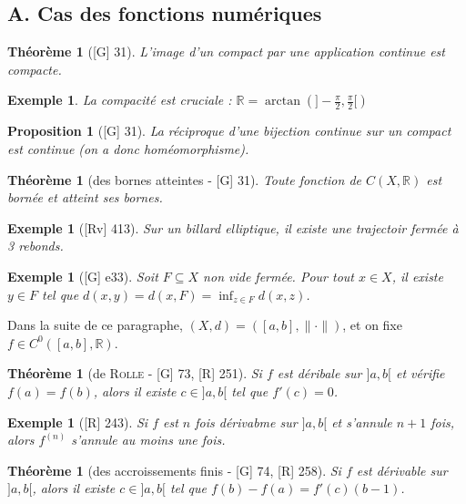 \documentclass[10pt, a4paper, parskip=full, twoside, twocolumn]{report}
\newtheorem{theorem}[definition]{Théorème}
\newtheorem{proposition}[definition]{Proposition}
\newtheorem{example}[definition]{Exemple}
\newcommand{\IR}{\mathbb{R}}
\begin{document}
\subsection*{A. Cas des fonctions numériques}

\begin{theorem}[\textnormal{[G] 31}]
	L'image d'un compact par une application continue est compacte.
\end{theorem}

\begin{example}
	La compacité est cruciale : $\IR = \arctan\left(]-\frac{\pi}{2},\frac{\pi}{2}[\right)$
\end{example}

\begin{proposition}[\textnormal{[G] 31}]
	La réciproque d'une bijection continue sur un compact est continue (on a donc homéomorphisme).
\end{proposition}

\begin{theorem}[des bornes atteintes - \textnormal{[G] 31}]
	Toute fonction de $C(X,\IR)$ est bornée et atteint ses bornes.
\end{theorem}

\begin{example}[\textnormal{[Rv] 413}]
	Sur un billard elliptique, il existe une trajectoir fermée à 3 rebonds.
\end{example}

\begin{example}[\textnormal{[G] e33}]
	Soit $F\subseteq X$ non vide fermée. Pour tout $x\in X$, il existe $y\in F$ tel que $d(x,y)=d(x,F)=\inf_{z\in F} d(x,z)$.
\end{example}

\textcolor{paragraphtext}{Dans la suite de ce paragraphe, $(X,d) = ([a,b], \|\cdot\|)$, et on fixe $f\in C^0([a,b], \IR)$.}

\begin{theorem}[de \textsc{Rolle} - \textnormal{[G] 73, [R] 251}]
	Si $f$ est déribale sur $]a,b[$ et vérifie $f(a)=f(b)$, alors il existe $c\in ]a,b[$ tel que $f'(c)=0$.
\end{theorem}

\begin{example}[\textnormal{[R] 243}]
	Si $f$ est $n$ fois dérivabme sur $]a,b[$ et s'annule $n+1$ fois, alors $f^{(n)}$ s'annule au moins une fois.
\end{example}

\begin{theorem}[des accroissements finis - \textnormal{[G] 74, [R] 258}]
	Si $f$ est dérivable sur $]a,b[$, alors il existe $c\in ]a,b[$ tel que $f(b)-f(a) = f'(c)(b-1)$.
\end{theorem}
\end{document}
